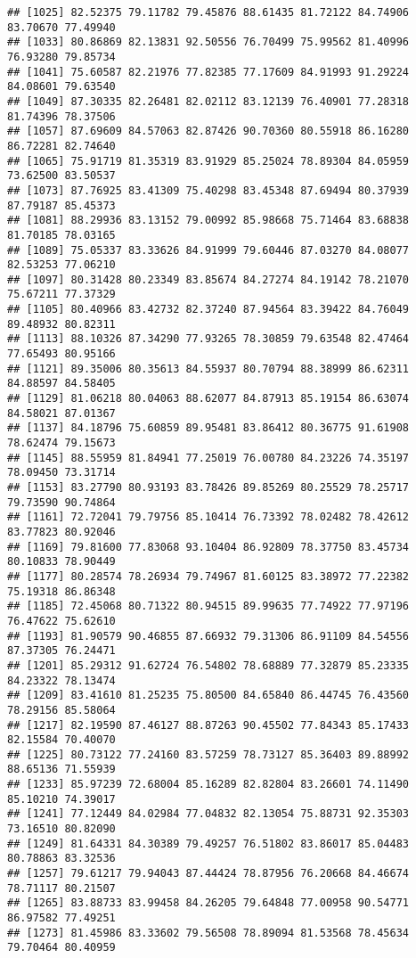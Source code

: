 \documentclass[
]{article}
\begin{document}
\begin{verbatim}
## [1025] 82.52375 79.11782 79.45876 88.61435 81.72122 84.74906 83.70670 77.49940
## [1033] 80.86869 82.13831 92.50556 76.70499 75.99562 81.40996 76.93280 79.85734
## [1041] 75.60587 82.21976 77.82385 77.17609 84.91993 91.29224 84.08601 79.63540
## [1049] 87.30335 82.26481 82.02112 83.12139 76.40901 77.28318 81.74396 78.37506
## [1057] 87.69609 84.57063 82.87426 90.70360 80.55918 86.16280 86.72281 82.74640
## [1065] 75.91719 81.35319 83.91929 85.25024 78.89304 84.05959 73.62500 83.50537
## [1073] 87.76925 83.41309 75.40298 83.45348 87.69494 80.37939 87.79187 85.45373
## [1081] 88.29936 83.13152 79.00992 85.98668 75.71464 83.68838 81.70185 78.03165
## [1089] 75.05337 83.33626 84.91999 79.60446 87.03270 84.08077 82.53253 77.06210
## [1097] 80.31428 80.23349 83.85674 84.27274 84.19142 78.21070 75.67211 77.37329
## [1105] 80.40966 83.42732 82.37240 87.94564 83.39422 84.76049 89.48932 80.82311
## [1113] 88.10326 87.34290 77.93265 78.30859 79.63548 82.47464 77.65493 80.95166
## [1121] 89.35006 80.35613 84.55937 80.70794 88.38999 86.62311 84.88597 84.58405
## [1129] 81.06218 80.04063 88.62077 84.87913 85.19154 86.63074 84.58021 87.01367
## [1137] 84.18796 75.60859 89.95481 83.86412 80.36775 91.61908 78.62474 79.15673
## [1145] 88.55959 81.84941 77.25019 76.00780 84.23226 74.35197 78.09450 73.31714
## [1153] 83.27790 80.93193 83.78426 89.85269 80.25529 78.25717 79.73590 90.74864
## [1161] 72.72041 79.79756 85.10414 76.73392 78.02482 78.42612 83.77823 80.92046
## [1169] 79.81600 77.83068 93.10404 86.92809 78.37750 83.45734 80.10833 78.90449
## [1177] 80.28574 78.26934 79.74967 81.60125 83.38972 77.22382 75.19318 86.86348
## [1185] 72.45068 80.71322 80.94515 89.99635 77.74922 77.97196 76.47622 75.62610
## [1193] 81.90579 90.46855 87.66932 79.31306 86.91109 84.54556 87.37305 76.24471
## [1201] 85.29312 91.62724 76.54802 78.68889 77.32879 85.23335 84.23322 78.13474
## [1209] 83.41610 81.25235 75.80500 84.65840 86.44745 76.43560 78.29156 85.58064
## [1217] 82.19590 87.46127 88.87263 90.45502 77.84343 85.17433 82.15584 70.40070
## [1225] 80.73122 77.24160 83.57259 78.73127 85.36403 89.88992 88.65136 71.55939
## [1233] 85.97239 72.68004 85.16289 82.82804 83.26601 74.11490 85.10210 74.39017
## [1241] 77.12449 84.02984 77.04832 82.13054 75.88731 92.35303 73.16510 80.82090
## [1249] 81.64331 84.30389 79.49257 76.51802 83.86017 85.04483 80.78863 83.32536
## [1257] 79.61217 79.94043 87.44424 78.87956 76.20668 84.46674 78.71117 80.21507
## [1265] 83.88733 83.99458 84.26205 79.64848 77.00958 90.54771 86.97582 77.49251
## [1273] 81.45986 83.33602 79.56508 78.89094 81.53568 78.45634 79.70464 80.40959

\end{verbatim}
\end{document}
